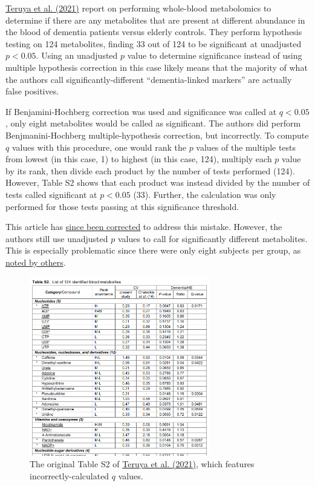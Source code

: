 \documentclass[letterpaper, 12pt]{article}
\begin{document}
\href{https://doi.org/10.1073/pnas.2022857118}{Teruya et al. (2021)} report on performing whole-blood metabolomics to determine if there are any metabolites that are present at different abundance in the blood of dementia patients versus elderly controls. They perform hypothesis testing on 124 metabolites, finding 33 out of 124 to be significant at unadjusted $p < 0.05$. Using an unadjusted $p$ value to determine significance instead of using multiple hypothesis correction in this case likely means that the majority of what the authors call significantly-different ``dementia-linked markers'' are actually false positives.

If Benjamini-Hochberg correction was used and significance was called at $q < 0.05$, only eight metabolites would be called as significant. The authors did perform Benjmanini-Hochberg multiple-hypothesis correction, but incorrectly. To compute $q$ values with this procedure, one would rank the $p$ values of the multiple tests from lowest (in this case, 1) to highest (in this case, 124), multiply each $p$ value by its rank, then divide each product by the number of tests performed (124). However, Table S2 shows that each product was instead divided by the number of tests called significant at $p < 0.05$ (33). Further, the calculation was only performed for those tests passing at this significance threshold.

This article has \href{https://doi.org/10.1073/pnas.2419538121}{since been corrected} to address this mistake. However, the authors still use unadjusted $p$ values to call for significantly different metabolites. This is especially problematic since there were only eight subjects per group, as \href{https://doi.org/10.1073/pnas.2118654119}{noted by others}.

\pagebreak

\begin{figure}[h!tbp]
    \centering
    \includegraphics[width=0.7\textwidth]{img/multiple_hypothesis_correction/image-1715611965675.png}
    \caption*{The original Table S2 of \href{https://doi.org/10.1073/pnas.2022857118}{Teruya et al. (2021)}, which features incorrectly-calculated $q$ values.}
\end{figure}
\end{document}
